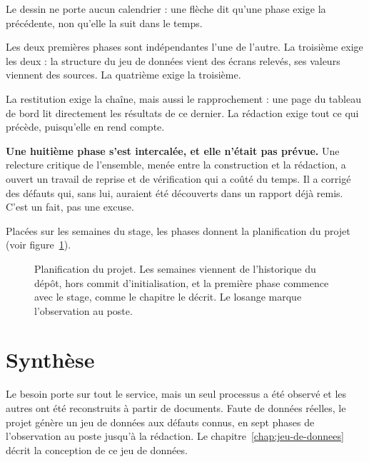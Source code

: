 Le dessin ne porte aucun calendrier : une flèche dit qu'une phase exige la précédente, non
qu'elle la suit dans le temps.

\medskip

Les deux premières phases sont indépendantes l'une de l'autre. La troisième exige les deux : la
structure du jeu de données vient des écrans relevés, ses valeurs viennent des sources. La
quatrième exige la troisième.

La restitution exige la chaîne, mais aussi le rapprochement : une page du tableau de bord lit
directement les résultats de ce dernier. La rédaction exige tout ce qui précède, puisqu'elle en
rend compte.

\textbf{Une huitième phase s'est intercalée, et elle n'était pas prévue.} Une relecture critique de
l'ensemble, menée entre la construction et la rédaction, a ouvert un travail de reprise et de
vérification qui a coûté du temps. Il a corrigé des défauts qui, sans lui, auraient été découverts
dans un rapport déjà remis. C'est un fait, pas une excuse.

Placées sur les semaines du stage, les phases donnent la planification du projet (voir
figure~\ref{fig:planification}).

\begin{figure}[htbp]
\centering

\caption[Planification du projet]{Planification du projet. Les semaines viennent de l'historique du
dépôt, hors commit d'initialisation, et la première phase commence avec le stage, comme le chapitre
le décrit. Le losange marque l'observation au poste.}\label{fig:planification}
\end{figure}

\section*{Synthèse}

Le besoin porte sur tout le service, mais un seul processus a été observé et les autres ont été
reconstruits à partir de documents. Faute de données réelles, le projet génère un jeu de données
aux défauts connus, en sept phases de l'observation au poste jusqu'à la rédaction. Le
chapitre~\ref{chap:jeu-de-donnees} décrit la conception de ce jeu de données.
